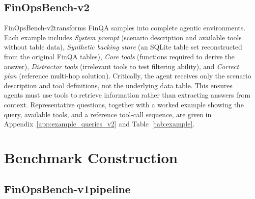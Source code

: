 \documentclass[11pt]{article}
\newcommand{\synthsubset}{FinOpsBench-v1}\xspace
\newcommand{\groundedfinqa}{FinOpsBench-v2}\xspace
\begin{document}
\subsection{\groundedfinqa}
\label{sec:groundedfinqa}

\groundedfinqa transforms FinQA samples into complete agentic environments. Each example includes \emph{System prompt} (scenario description and available tools without table data), \emph{Synthetic backing store} (an SQLite \citep{owens2010sqlite} table set reconstructed from the original FinQA tables), \emph{Core tools} (functions required to derive the answer),  \emph{Distractor tools} (irrelevant tools to test filtering ability), and \emph{Correct plan} (reference multi-hop solution).
Critically, the agent receives only the scenario description and tool definitions, not the underlying data table. This ensures agents must use tools to retrieve information rather than extracting answers from context.
Representative questions, together with a worked example showing the query, available tools, and a reference tool-call sequence, are given in Appendix~\ref{app:example_queries_v2} and Table~\ref{tab:example}.

\section{Benchmark Construction}

\subsection{\synthsubset pipeline}
\label{sec:synthsql_pipeline}
\end{document}
